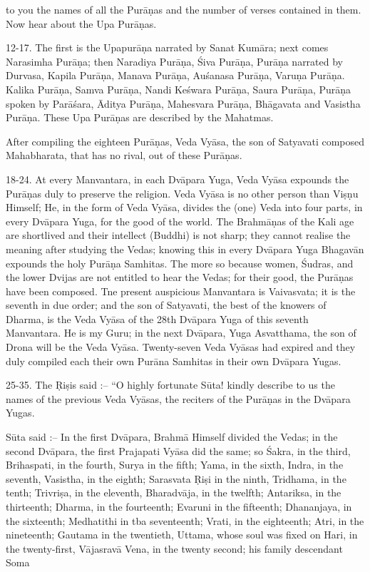 to you the names of all the Pur\=a\d{n}as and the number of verses contained in them. Now hear about the Upa Pur\=a\d{n}as.

12-17. The first is the Upapur\=a\d{n}a narrated by Sanat Kum\=ara; next comes Narasimha Pur\=a\d{n}a; then Naradiya Pur\=a\d{n}a, \'Siva Pur\=a\d{n}a, Pur\=a\d{n}a narrated by Durvasa, Kapila Pur\=a\d{n}a, Manava Pur\=a\d{n}a, Au\'sanasa Pur\=a\d{n}a, Varu\d{n}a Pur\=a\d{n}a. Kalika Pur\=a\d{n}a, Samva Pur\=a\d{n}a, Nandi Ke\'swara Pur\=a\d{n}a, Saura Pur\=a\d{n}a, Pur\=a\d{n}a spoken by Par\=a\'sara, \=Aditya Pur\=a\d{n}a, Mahesvara Pur\=a\d{n}a, Bh\=agavata and Vasistha Pur\=a\d{n}a. These Upa Pur\=a\d{n}as are described by the Mahatmas.

After compiling the eighteen Pur\=a\d{n}as, Veda Vy\=asa, the son of Satyavati composed Mahabharata, that has no rival, out of these Pur\=a\d{n}as.

18-24. At every Manvantara, in each Dv\=apara Yuga, Veda Vy\=asa expounds the Pur\=a\d{n}as duly to preserve the religion. Veda Vy\=asa is no other person than Vi\d{s}\d{n}u Himself; He, in the form of Veda Vy\=asa, divides the (one) Veda into four parts, in every Dv\=apara Yuga, for the good of the world. The Brahm\=a\d{n}as of the Kali age are shortlived and their intellect (Buddhi) is not sharp; they cannot realise the meaning after studying the Vedas; knowing this in every Dv\=apara Yuga Bhagav\=an expounds the holy Pur\=a\d{n}a Samhitas. The more so because women, \'Sudras, and the lower Dvijas are not entitled to hear the Vedas; for their good, the Pur\=a\d{n}as have been composed. Tne present auspicious Manvantara is Vaivasvata; it is the seventh in due order; and the son of Satyavati, the best of the knowers of Dharma, is the Veda Vy\=asa of the 28th Dv\=apara Yuga of this seventh Manvantara. He is my Guru; in the next Dv\=apara, Yuga Asvatthama, the son of Drona will be the Veda Vy\=asa. Twenty-seven Veda Vy\=asas had expired and they duly compiled each their own Pur\=ana Samhitas in their own Dv\=apara Yugas.

25-35. The \d{R}i\d{s}is said :-- ``O highly fortunate S\=uta! kindly describe to us the names of the previous Veda Vy\=asas, the reciters of the Pur\=a\d{n}as in the Dv\=apara Yugas.

S\=uta said :-- In the first Dv\=apara, Brahm\=a Himself divided the Vedas; in the second Dv\=apara, the first Prajapati Vy\=asa did the same; so \'Sakra, in the third, Brihaspati, in the fourth, Surya in the fifth; Yama, in the sixth, Indra, in the seventh, Vasistha, in the eighth; Sarasvata \d{R}i\d{s}i in the ninth, Tridhama, in the tenth; Trivri\d{s}a, in the eleventh, Bharadv\=aja, in the twelfth; Antariksa, in the thirteenth; Dharma, in the fourteenth; Evaruni in the fifteenth; Dhananjaya, in the sixteenth; Medhatithi in tba seventeenth; Vrati, in the eighteenth; Atri, in the nineteenth; Gautama in the twentieth, Uttama, whose soul was fixed on Hari, in the twenty-first, V\=ajasrav\=a Vena, in the twenty second; his family descendant Soma

